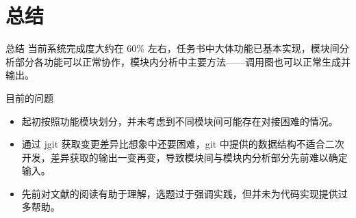 %
%
%
%
\section{总结}
    \begin{frame}{总结}
        当前系统完成度大约在 60\% 左右，任务书中大体功能已基本实现，模块间分析部分各功能可以正常协作，模块内分析中主要方法——调用图也可以正常生成并输出。
        \\
        \begin{block}{目前的问题}
            \begin{itemize}
                \item 起初按照功能模块划分，并未考虑到不同模块间可能存在对接困难的情况。
                \item 通过 jgit 获取变更差异比想象中还要困难，git 中提供的数据结构不适合二次开发，差异获取的输出一变再变，导致模块间与模块内分析部分先前难以确定输入。
                \item 先前对文献的阅读有助于理解，选题过于强调实践，但并未为代码实现提供过多帮助。
            \end{itemize}
        \end{block}
    \end{frame}